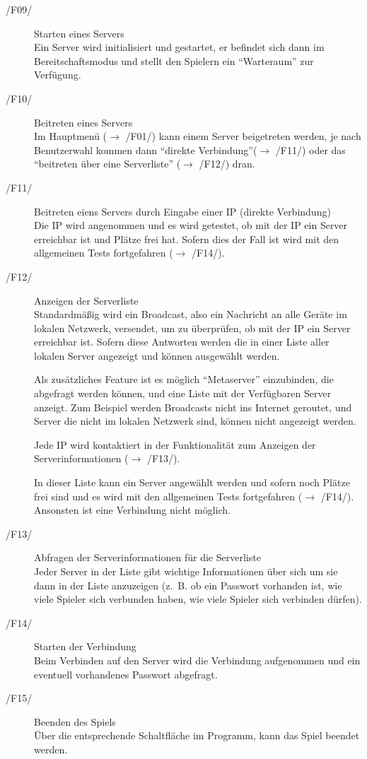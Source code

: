 \documentclass[a4paper,10pt]{article}
\begin{document}
\begin{description}
\item[/F09/] Starten eines Servers \\
Ein Server wird initialisiert und gestartet, er befindet sich dann im Bereitschaftsmodus und stellt den Spielern ein ``Warteraum'' zur Verfügung.

\item[/F10/] Beitreten eines Servers \\
Im Hauptmenü ($\rightarrow$ /F01/) kann einem Server beigetreten werden, je nach Benutzerwahl kommen dann ``direkte Verbindung''($\rightarrow$ /F11/) oder das ``beitreten über eine Serverliste'' ($\rightarrow$ /F12/) dran.

\item[/F11/] Beitreten eiens Servers durch Eingabe einer IP (direkte Verbindung) \\
Die IP wird angenommen und es wird getestet, ob mit der IP ein Server erreichbar ist und Plätze frei hat. Sofern dies der Fall ist wird mit den allgemeinen Tests fortgefahren ($\rightarrow$ /F14/).

\item[/F12/] Anzeigen der Serverliste \\
Standardmäßig wird ein Broadcast, also ein Nachricht an alle Geräte im lokalen Netzwerk, versendet, um zu überprüfen, ob mit der IP ein Server erreichbar ist. Sofern diese Antworten werden die in einer Liste aller lokalen Server angezeigt und können ausgewählt werden.

Als zusätzliches Feature ist es möglich ``Metaserver'' einzubinden, die abgefragt werden können, und eine Liste mit der Verfügbaren Server anzeigt. Zum Beispiel werden Broadcasts nicht ins Internet geroutet, und Server die nicht im lokalen Netzwerk sind, können nicht angezeigt werden.

Jede IP wird kontaktiert in der Funktionalität zum Anzeigen der Serverinformationen ($\rightarrow$ /F13/).

In dieser Liste kann ein Server angewählt werden und sofern noch Plätze frei sind und es wird mit den allgemeinen Tests fortgefahren ($\rightarrow$ /F14/). Ansonsten ist eine Verbindung nicht möglich.
\item[/F13/] Abfragen der Serverinformationen für die Serverliste \\
Jeder Server in der Liste gibt wichtige Informationen über sich um sie dann in der Liste anzuzeigen (z.~B. ob ein Passwort vorhanden ist, wie viele Spieler sich verbunden haben, wie viele Spieler sich verbinden dürfen).
\item[/F14/] Starten der Verbindung \\
Beim Verbinden auf den Server wird die Verbindung aufgenommen und ein eventuell vorhandenes Passwort abgefragt.
\item[/F15/] Beenden des Spiels \\
Über die entsprechende Schaltfläche im Programm, kann das Spiel beendet werden.
\end{description}
\end{document}
